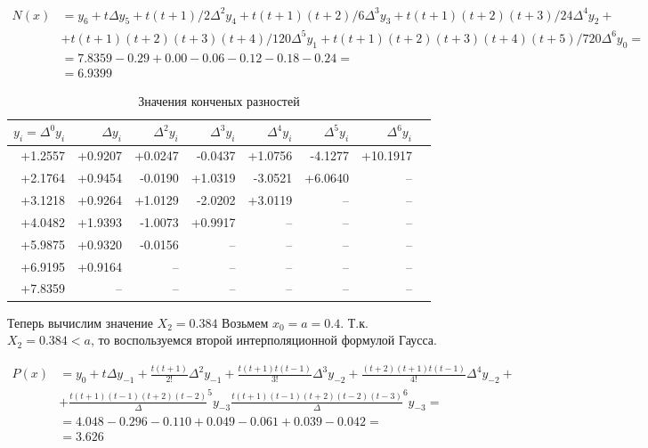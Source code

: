 \begin{align*}
  N(x) &= y_6 + t \Delta y_5 + t(t+1)/2 \Delta^2 y_4 + t(t+1)(t+2)/6 \Delta^3 y_3 + t(t+1)(t+2)(t+3)/24 \Delta^4 y_2 + \\ &+ t(t+1)(t+2)(t+3)(t+4)/120 \Delta^5 y_1 + 
  t(t+1)(t+2)(t+3)(t+4)(t+5)/720 \Delta^6 y_0 = \\
  &= 7.8359 -0.29 + 0.00 -0.06 -0.12 -0.18 -0.24 = \\
  &= 6.9399
\end{align*}

\begin{table}
  \caption{Значения конченых разностей}\label{tab:finite_dif}
  \centering
  \begin{tabular}{rrrrrrrr}
    \toprule
      \(y_i = \Delta^0 y_i\)
    & \(\Delta y_i\)
    & \(\Delta^2 y_i\)
    & \(\Delta^3 y_i\)
    & \(\Delta^4 y_i\)
    & \(\Delta^5 y_i\)
    & \(\Delta^6 y_i\) \\
    \midrule
    +1.2557  &      +0.9207 &       +0.0247 &       -0.0437 &       +1.0756 &       -4.1277 &       +10.1917 \\
    +2.1764  &      +0.9454 &       -0.0190 &       +1.0319 &       -3.0521 &       +6.0640 & -- \\
    +3.1218  &      +0.9264 &       +1.0129 &       -2.0202 &       +3.0119 & -- & -- \\
    +4.0482  &      +1.9393 &       -1.0073 &       +0.9917 & -- & -- & -- \\
    +5.9875  &      +0.9320 &       -0.0156 & -- & -- & -- & -- \\
    +6.9195  &      +0.9164 & -- & -- & -- & -- & -- \\
    +7.8359  &  -- & -- & -- & -- & -- & -- \\

    \bottomrule
  \end{tabular}
\end{table}

Теперь вычислим значение \(X_2 = 0.384 \)
Возьмем \(x_0 = a = 0.4 \).
Т.к. \(X_2 = 0.384 < a \), то воспользуемся
второй интерполяционной формулой Гаусса.

\begin{align*}
  P(x) &=
  y_0 + t \Delta y_{-1} + \frac{t(t+1)}{2!} \Delta^2 y_{-1}
  + \frac{t(t+1)t(t-1)}{3!} \Delta^3 y_{-2} +
  \frac{(t+2)(t+1)t(t-1)}{4!} \Delta^4 y_{-2} + \\
  &+ \frac{t(t+1)(t-1)(t+2)(t-2)} \Delta^5 y_{-3}
  \frac{t(t+1)(t-1)(t+2)(t-2)(t-3)} \Delta^6 y_{-3} = \\
  &= 4.048  -0.296  -0.110 + 0.049  -0.061 + 0.039  -0.042 = \\
  &= 3.626
\end{align*}

